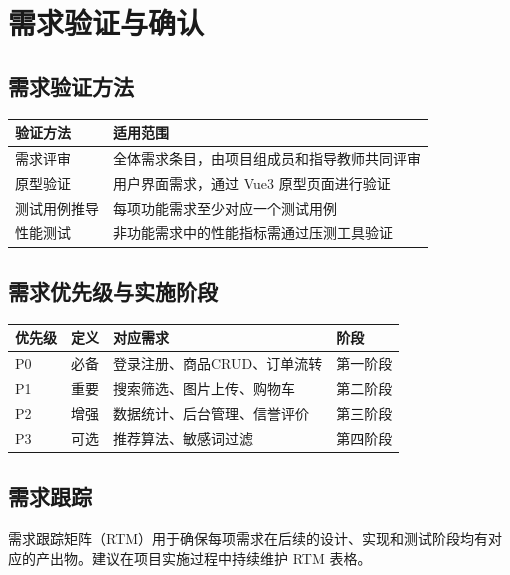 \documentclass[12pt,a4paper,UTF8]{ctexart}
\begin{document}
\section{需求验证与确认}

\subsection{需求验证方法}

\begin{longtable}{p{}|p{}}
    \toprule
    \textbf{验证方法} & \textbf{适用范围} \\
    \midrule
    \endhead
    \bottomrule
    \endfoot

    需求评审 & 全体需求条目，由项目组成员和指导教师共同评审 \\
    原型验证 & 用户界面需求，通过 Vue3 原型页面进行验证 \\
    测试用例推导 & 每项功能需求至少对应一个测试用例 \\
    性能测试 & 非功能需求中的性能指标需通过压测工具验证 \\
\end{longtable}

\subsection{需求优先级与实施阶段}

\begin{longtable}{p{}|p{}|p{}|p{}}
    \toprule
    \textbf{优先级} & \textbf{定义} & \textbf{对应需求} & \textbf{阶段} \\
    \midrule
    \endhead
    \bottomrule
    \endfoot

    P0 & 必备 & 登录注册、商品CRUD、订单流转 & 第一阶段 \\
    P1 & 重要 & 搜索筛选、图片上传、购物车 & 第二阶段 \\
    P2 & 增强 & 数据统计、后台管理、信誉评价 & 第三阶段 \\
    P3 & 可选 & 推荐算法、敏感词过滤 & 第四阶段 \\
\end{longtable}

\subsection{需求跟踪}

需求跟踪矩阵（RTM）用于确保每项需求在后续的设计、实现和测试阶段均有对应的产出物。建议在项目实施过程中持续维护 RTM 表格。
\end{document}
